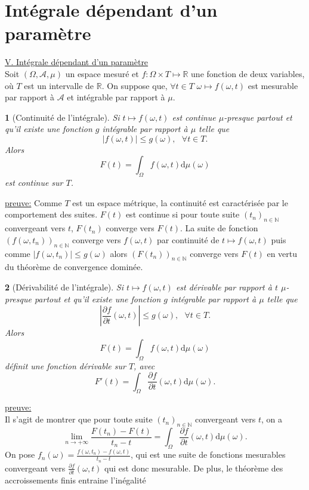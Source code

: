 \documentclass[8pt,notheorems]{beamer}
\def \N{\mathbb N}
\def \R{\mathbb{R}}
\def \Om{\Omega}
\def \om{\omega}
\newtheorem{prop}{\translate{Proposition}}
\theoremstyle{definition}
\theoremstyle{example}
\theoremstyle{mystyle}
\theoremstyle{plain}
\begin{document}
\section{Intégrale dépendant d'un paramètre}
\begin{frame}[allowframebreaks]
\underline{V. Intégrale dépendant d'un paramètre}\\

Soit $(\Om,\mathcal{A},\mu)$ un espace mesuré et $f:\Om\times T\mapsto \mathbb{R}$ une fonction de deux variables, où $T$ est un intervalle de $\R$. On suppose que, $\forall t\in T$ $\om\mapsto f(\om,t)$ est mesurable par rapport à $\mathcal{A}$ et intégrable par rapport à $\mu$.
\begin{prop}[Continuité de l'intégrale]
Si $t\mapsto f(\om,t)$ est continue $\mu$-presque partout et qu'il existe une fonction $g$ intégrable par rapport à $\mu$ telle que
$$
|f(\om,t)|\leq g(\om),\text{ }\forall t\in T.
$$
Alors
$$
F(t)=\int_{\Om} f(\om,t)\text{d}\mu(\om)
$$
est continue sur $T$.
\end{prop}
\underline{preuve:} Comme $T$ est un espace métrique, la continuité est caractérisée par le comportement des suites. $F(t)$ est continue si pour toute suite $(t_n)_{n\in\N}$ convergeant vers $t$, $F(t_n)$ converge vers $F(t)$. La suite de fonction $(f(\om,t_n))_{n\in\N}$ converge vers $f(\om, t)$ par continuité de $t\mapsto f(\om,t)$ puis comme $|f(\om,t_n)|\leq g(\om)$ alors $(F(t_n))_{n\in\N}$ converge vers $F(t)$ en vertu du théorème de convergence dominée.
\begin{prop}[Dérivabilité de l'intégrale]
Si $t\mapsto f(\om,t)$ est dérivable par rapport à $t$ $\mu$-presque partout et qu'il existe une fonction $g$ intégrable par rapport à $\mu$ telle que
$$
\left|\frac{\partial f}{\partial t}(\om,t)\right|\leq g(\om),\text{ }\forall t\in T.
$$
Alors
$$
F(t)=\int_{\Om} f(\om,t)\text{d}\mu(\om)
$$
définit une fonction dérivable sur $T$, avec
$$
F'(t)=\int_{\Om} \frac{\partial f}{\partial t}(\om,t)\text{d}\mu(\om).
$$
\end{prop}
\underline{preuve:}\\
Il s'agit de montrer que pour toute suite $(t_n)_{n\in\N}$ convergeant vers $t$, on a
$$
\underset{n\rightarrow+\infty}{\lim}\frac{F(t_n)-F(t)}{t_n-t}=\int_\Om \frac{\partial f}{\partial t}(\om,t)\text{d}\mu(\om).
$$
On pose $f_n(\om)=\frac{f(\om,t_n)-f(\om,t)}{t_n-t}$, qui est une suite de fonctions mesurables convergeant vers $\frac{\partial f}{\partial t}(\om,t)$ qui est donc mesurable. De plus, le théorème des accroissements finis entraine l'inégalité

\end{frame}
\end{document}
